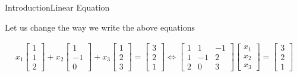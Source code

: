 \documentclass[10pt]{beamer}
\begin{document}
\begin{frame}[shrink=20]{Introduction}{Linear Equation}

Let us change the way we write the above equations

\begin{align}
x_{1}\begin{bmatrix}1 \\ 1 \\ 2 \end{bmatrix} + x_{2}\begin{bmatrix} 1 \\ -1 \\ 0 \end{bmatrix} + x_{3}\begin{bmatrix}1 \\ 2 \\ 3 \end{bmatrix} = \begin{bmatrix} 3 \\ 2 \\ 1 \end{bmatrix} \Leftrightarrow \begin{bmatrix} 1 & 1 & -1 \\ 1 & -1 & 2 \\ 2 & 0 & 3 \end{bmatrix}\begin{bmatrix} x_{1} \\ x_{2} \\ x_{3}\end{bmatrix} = \begin{bmatrix} 3 \\ 2 \\ 1 \end{bmatrix}
\end{align}



\end{frame}
\end{document}
